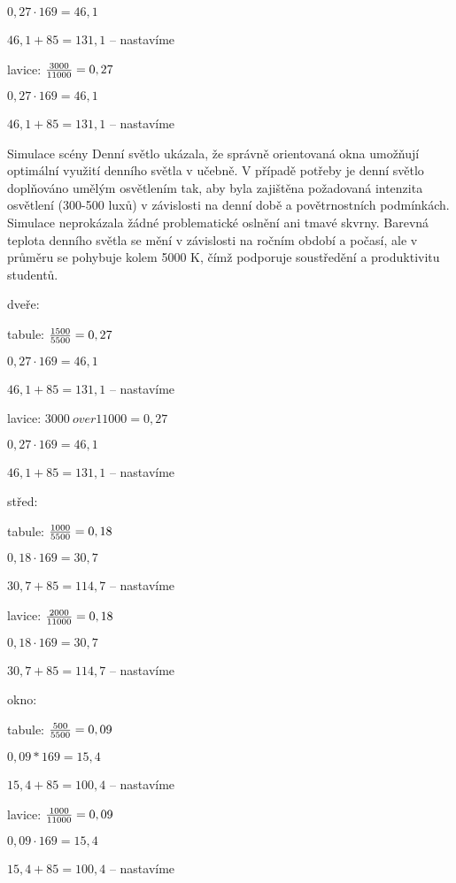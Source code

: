         ${0,27 \cdot 169} = 46,1$

        $46,1 + 85 = 131,1$ – nastavíme

lavice: ${3000 \over 11000} = 0,27$

        ${0,27 \cdot 169} = 46,1$

        $46,1 + 85 = 131,1$ – nastavíme


Simulace scény Denní světlo ukázala, že správně orientovaná okna umožňují optimální využití denního
světla v učebně. V případě potřeby je denní světlo doplňováno umělým osvětlením tak, aby byla zajištěna požadovaná
intenzita osvětlení (300-500 luxů) v závislosti na denní době a povětrnostních podmínkách. Simulace neprokázala žádné
problematické oslnění ani tmavé skvrny. Barevná teplota denního světla se mění v závislosti na ročním období a počasí,
ale v průměru se pohybuje kolem 5000 K, čímž podporuje soustředění a produktivitu studentů.

{\sbf dveře:}

tabule: ${1500 \over 5500} = 0,27$

        ${0,27 \cdot 169} = 46,1$

        $46,1 + 85 = 131,1$ – nastavíme

lavice: ${3000 \ over 11000} = 0,27$

        ${0,27 \cdot 169} = 46,1$

        $46,1 + 85 = 131,1$ – nastavíme

{\sbf střed:}


tabule: ${1000 \over 5500} = 0,18$

        ${0,18 \cdot 169} = 30,7$

        $30,7 + 85 = 114,7$ – nastavíme

lavice: ${2000 \over 11000} = 0,18$

        ${0,18 \cdot 169} = 30,7$

        $30,7 + 85 = 114,7$ – nastavíme

{\sbf okno:}


tabule: ${500 \over 5500} = 0,09$

        ${0,09 * 169} = 15,4$

        $15,4 + 85 = 100,4$ – nastavíme

lavice: ${1000 \over 11000} = 0,09$

        ${0,09 \cdot 169} = 15,4$

        $15,4 + 85 = 100,4$ – nastavíme

